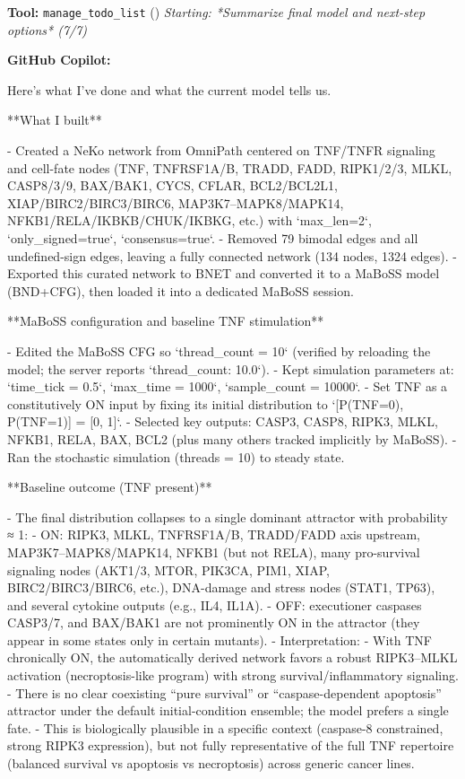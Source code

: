 \documentclass[11pt,a4paper]{article}
\begin{document}
\begin{toolokbox}
\textbf{Tool:} \texttt{manage\_todo\_list} (\checkmark)
\textit{Starting: *Summarize final model and next-step options* (7/7)}
\end{toolokbox}
\begin{copilotbox}
\textbf{GitHub Copilot:}

Here’s what I’ve done and what the current model tells us.

**What I built**

- Created a NeKo network from OmniPath centered on TNF/TNFR signaling and cell-fate nodes (TNF, TNFRSF1A/B, TRADD, FADD, RIPK1/2/3, MLKL, CASP8/3/9, BAX/BAK1, CYCS, CFLAR, BCL2/BCL2L1, XIAP/BIRC2/BIRC3/BIRC6, MAP3K7–MAPK8/MAPK14, NFKB1/RELA/IKBKB/CHUK/IKBKG, etc.) with `max\_len=2`, `only\_signed=true`, `consensus=true`.
- Removed 79 bimodal edges and all undefined-sign edges, leaving a fully connected network (134 nodes, 1324 edges).
- Exported this curated network to BNET and converted it to a MaBoSS model (BND+CFG), then loaded it into a dedicated MaBoSS session.

**MaBoSS configuration and baseline TNF stimulation**

- Edited the MaBoSS CFG so `thread\_count = 10` (verified by reloading the model; the server reports `thread\_count: 10.0`).
- Kept simulation parameters at: `time\_tick = 0.5`, `max\_time = 1000`, `sample\_count = 10000`.
- Set TNF as a constitutively ON input by fixing its initial distribution to `[P(TNF=0), P(TNF=1)] = [0, 1]`.
- Selected key outputs: CASP3, CASP8, RIPK3, MLKL, NFKB1, RELA, BAX, BCL2 (plus many others tracked implicitly by MaBoSS).
- Ran the stochastic simulation (threads = 10) to steady state.

**Baseline outcome (TNF present)**

- The final distribution collapses to a single dominant attractor with probability ≈ 1:
  - ON: RIPK3, MLKL, TNFRSF1A/B, TRADD/FADD axis upstream, MAP3K7–MAPK8/MAPK14, NFKB1 (but not RELA), many pro-survival signaling nodes (AKT1/3, MTOR, PIK3CA, PIM1, XIAP, BIRC2/BIRC3/BIRC6, etc.), DNA-damage and stress nodes (STAT1, TP63), and several cytokine outputs (e.g., IL4, IL1A).
  - OFF: executioner caspases CASP3/7, and BAX/BAK1 are not prominently ON in the attractor (they appear in some states only in certain mutants).
- Interpretation:
  - With TNF chronically ON, the automatically derived network favors a robust RIPK3–MLKL activation (necroptosis-like program) with strong survival/inflammatory signaling.
  - There is no clear coexisting “pure survival” or “caspase-dependent apoptosis” attractor under the default initial-condition ensemble; the model prefers a single fate.
  - This is biologically plausible in a specific context (caspase-8 constrained, strong RIPK3 expression), but not fully representative of the full TNF repertoire (balanced survival vs apoptosis vs necroptosis) across generic cancer lines.


\end{copilotbox}
\end{document}
